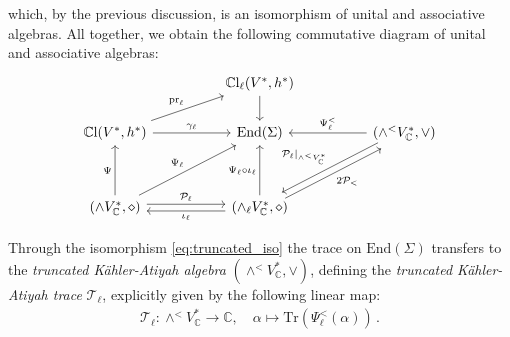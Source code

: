 \documentclass[10pt,a4paper,twoside,reqno]{amsart}
\theoremstyle{plain}
\theoremstyle{definition}
\theoremstyle{remark}
\newcommand{\End}{\mathrm{End}}
\def\C{\mathbb{C}}
\newcommand{\Tr}{\mathrm{Tr}}
\begin{document}
\noindent
which, by the previous discussion, is an isomorphism of unital and associative algebras. All together, we obtain the following commutative diagram of unital and associative algebras:
$$\begin{tikzcd}
                                                                                                                                                        &  & {\mathbb{C}\mathrm{l}_\ell(V^*,h^*)} \arrow[d]                                                                                                                                   &  &                                                                                                                                           \\
{\mathbb{C}\mathrm{l}(V^*,h^*)} \arrow[rru, "\mathrm{pr}_\ell"] \arrow[rr, "\gamma_\ell"]                                                  &  & \mathrm{End}(\Sigma)                                                                                                                                                             &  & {(\wedge^<V^*_{\mathbb{C}},\vee)} \arrow[ll, "\Psi^<_\ell"'] \arrow[lldd, "\mathcal{P}_\ell|_{\wedge^<V^*_{\mathbb{C}}}"', shift right] \\
                                                                                                                                                        &  &                                                                                                                                                                                  &  &                                                                                                                                           \\
{(\wedge V^*_{\mathbb{C}},\diamond)} \arrow[uu, "\Psi"] \arrow[rruu, "\Psi_\ell"] \arrow[rr, "\mathcal{P}_\ell", shift left] &  & {(\wedge_\ell V^*_{\mathbb{C}},\diamond)} \arrow[uu, "\Psi_\ell\circ\iota_\ell"] \arrow[ll, "\iota_\ell", shift left] \arrow[rruu, "2\mathcal{P}_<"', shift right] &  &                                                                                                                                          
\end{tikzcd}$$

Through the isomorphism \eqref{eq:truncated_iso} the trace on $\End(\Sigma)$ transfers to the \emph{truncated Kähler-Atiyah algebra} $(\wedge^<V^*_\C,\vee)$, defining the \emph{truncated Kähler-Atiyah trace} $\mathcal{T}_\ell$, explicitly given by the following linear map: 
\begin{eqnarray*}
\mathcal{T}_\ell\colon\wedge^<V^*_\C\to\C,\quad\alpha\mapsto\Tr(\Psi^<_\ell(\alpha))\, .    
\end{eqnarray*}
\end{document}

